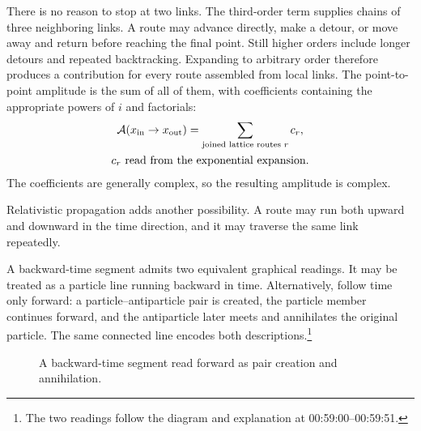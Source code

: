 There is no reason to stop at two links. The third-order term supplies chains of three neighboring links. A route may advance directly, make a detour, or move away and return before reaching the final point. Still higher orders include longer detours and repeated backtracking. Expanding to arbitrary order therefore produces a contribution for every route assembled from local links. The point-to-point amplitude is the sum of all of them, with coefficients containing the appropriate powers of \(i\) and factorials:
\begin{equation}
\begin{gathered}
\mathcal{A}(x_{\mathrm{in}}\to x_{\mathrm{out}})
=
\sum_{\text{joined lattice routes }r}c_r,
\\
c_r\ \hbox{read from the exponential expansion}.
\end{gathered}
\end{equation}
The coefficients are generally complex, so the resulting amplitude is complex.

Relativistic propagation adds another possibility. A route may run both upward and downward in the time direction, and it may traverse the same link repeatedly.

\begin{classroomqa}
\end{classroomqa}

A backward-time segment admits two equivalent graphical readings. It may be treated as a particle line running backward in time. Alternatively, follow time only forward: a particle--antiparticle pair is created, the particle member continues forward, and the antiparticle later meets and annihilates the original particle. The same connected line encodes both descriptions.\footnote{The two readings follow the diagram and explanation at 00:59:00--00:59:51.}

\begin{figure}[htbp]
\centering
{}
\caption{A backward-time segment read forward as pair creation and annihilation.}
\end{figure}

